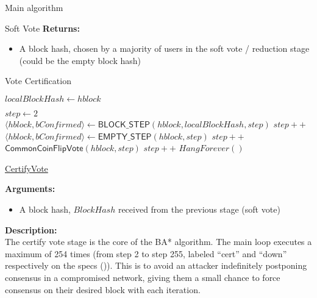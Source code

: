 \documentclass[10pt,a4paper]{article}
\begin{document}
\begin{section}{Main algorithm}
\begin{subsection}{Soft Vote}
\noindent \textbf{Returns:}
\begin{itemize}
    \item A block hash, chosen by a majority of users in the soft vote / reduction stage 
    (could be the empty block hash)
\end{itemize}

\end{subsection}
\begin{subsection}{Vote Certification}\label{ssect:certifyvote}
    \begin{algorithm}[H]
        \begin{algorithmic}[H]
        \State $localBlockHash \gets hblock$
    
        \State $step \gets 2$
            \\
            \State $\langle hblock, bConfirmed \rangle \gets \mathsf{BLOCK\_STEP}(hblock, localBlockHash, step)$
            \EndIf
            \State $step++$\\
       
            \State $ \langle hblock, bConfirmed \rangle \gets \mathsf{EMPTY\_STEP}(hblock,step)$
            \EndIf
            \State $step++$\\
    
            \State $\mathsf{CommonCoinFlipVote}(hblock, step)$
            \State $step++$
        \EndWhile
        \State $HangForever()$
        \EndFunction
        \end{algorithmic}
        \caption{\underline{CertifyVote}}
    \end{algorithm}
    
\noindent \textbf{Arguments:}
\begin{itemize}
    \item A block hash, $BlockHash$ received from the previous stage (soft vote)
  \end{itemize}

\noindent \textbf{Description:}\\
The certify vote stage is the core of the BA* algorithm.
The main loop executes a maximum of 254 times (from step 2 to step 255, labeled ``cert'' and ``down'' 
respectively on the specs (\cite{specs})).
This is to avoid an attacker indefinitely postponing consensus in a compromised network, giving them a 
small chance to force consensus on their desired block with each iteration.


\end{subsection}
\end{section}
\end{document}
